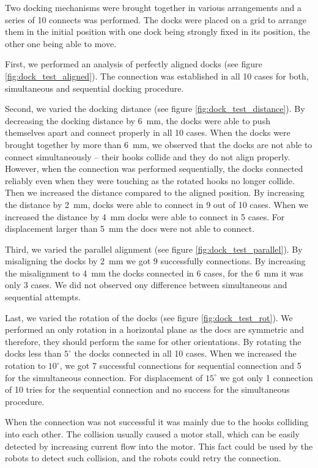 Two docking mechanisms were brought together in various arrangements and a
series of 10 connects was performed. The docks were placed on a grid to arrange
them in the initial position with one dock being strongly fixed in its position,
the other one being able to move.

First, we performed an analysis of perfectly aligned docks (see figure
\ref{fig:dock_test_aligned}). The connection was established in all 10 cases for
both, simultaneous and sequential docking procedure.

Second, we varied the docking distance (see figure
\ref{fig:dock_test_distance}). By decreasing the docking distance by 6~mm, the
docks were able to push themselves apart and connect properly in all 10 cases.
When the docks were brought together by more than 6~mm, we observed that the
docks are not able to connect simultaneously -- their hooks collide and they do
not align properly. However, when the connection was performed sequentially, the
docks connected reliably even when they were touching as the rotated hooks no
longer collide. Then we increased the distance compared to the aligned position.
By increasing the distance by 2~mm, docks were able to connect in 9 out of 10
cases. When we increased the distance by 4~mm docks were able to connect in 5
cases. For displacement larger than 5~mm the docs were not able to connect.

Third, we varied the parallel alignment (see figure
\ref{fig:dock_test_parallel}). By misaligning the docks by 2~mm we got 9
successfully connections. By increasing the misalignment to 4~mm the docks
connected in 6 cases, for the 6~mm it was only 3 cases. We did not observed ony
difference between simultaneous and sequential attempts.

Last, we varied the rotation of the docks (see figure \ref{fig:dock_test_rot}).
We performed an only rotation in a horizontal plane as the docs are symmetric
and therefore, they should perform the same for other orientations. By rotating
the docks less than $5^\circ$ the docks connected in all 10 cases. When we
increased the rotation to $10^\circ$, we got 7 successful connections for
sequential connection and 5 for the simultaneous connection. For displacement of
$15^\circ$ we got only 1 connection of 10 tries for the sequential connection
and no success for the simultaneous procedure.

When the connection was not successful it was mainly due to the hooks colliding
into each other. The collision usually caused a motor stall, which can be easily
detected by increasing current flow into the motor. This fact could be used by
the robots to detect such collision, and the robots could retry the connection.

